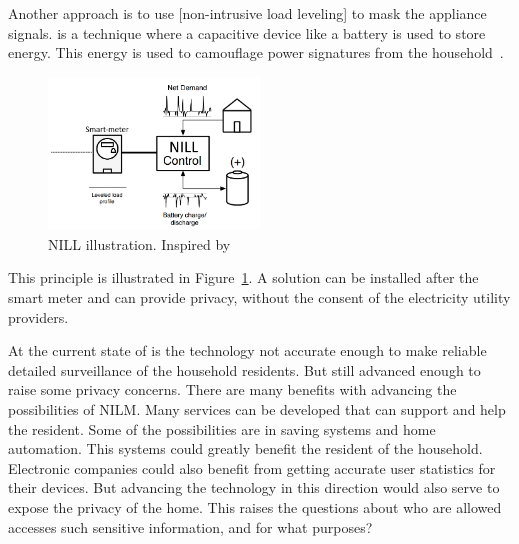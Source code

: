 Another approach is to use [non-intrusive load leveling] to mask the appliance signals.  is a technique where a capacitive device like a battery is used to store energy. This energy is used to camouflage power signatures from the household~\citep{RefWorks:36}. 

\begin{figure}[H]
\centering
\includegraphics[width=0.5\textwidth]{billeder/NILLILU.png}
\caption[NILL illustration.]{NILL illustration. Inspired by~\citep{RefWorks:36}}
\label{fig:NILL}
\end{figure}

This principle is illustrated in Figure~\ref{fig:NILL}. A  solution can be installed after the smart meter and can provide privacy, without the consent of the electricity utility providers.

At the current state of  is the technology not accurate enough to make reliable detailed surveillance of the household residents. But still advanced enough to raise some privacy concerns. There are many benefits with advancing the possibilities of NILM. Many services can be developed that can support and help the resident. Some of the possibilities are in saving systems and home automation. This systems could greatly benefit the resident of the household. Electronic companies could also benefit from getting accurate user statistics for their devices. But advancing the technology in this direction would also serve to expose the privacy of the home. This raises the questions about who are allowed accesses such sensitive information, and for what purposes?